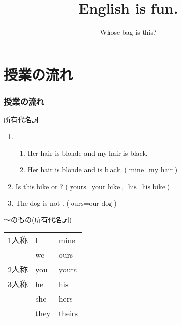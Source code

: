 \documentclass[aspectratio=169,xcolor={dvipsnames,table}]{beamer}
\title{English is fun.}
\subtitle{Whose bag is this?}
\author{}
\institute[]{}
\date[]
\begin{document}
\begin{frame}[plain]
  \titlepage
\end{frame}

\section*{授業の流れ}
\begin{frame}[plain]
  \frametitle{授業の流れ}
  \tableofcontents
\end{frame}

\begin{frame}[plain]{所有代名詞}
 
\begin{enumerate}
 \item \begin{enumerate}
	\item Her hair is blonde and my hair is black.
	\item Her hair is blonde and  is black. ($\text{mine} = \text{my hair}$)
       \end{enumerate}
 \item Is this bike  or ? ($\text{yours} = \text{your bike}$, $\text{his} = \text{his bike}$)
 \item The dog is not . ($\text{ours} = \text{our dog}$)
\end{enumerate}


\hfill{}

\end{frame}
\begin{frame}[plain]{〜のもの(所有代名詞)}
 
 \begin{center}
\begin{tabular}{lll}\toprule
1人称&I&mine\\
&we&ours\\
2人称&you&yours\\
3人称&he&his\\
&she&hers\\
&they&theirs\\
\bottomrule
\end{tabular}
\end{center}
\end{frame}
\end{document}
